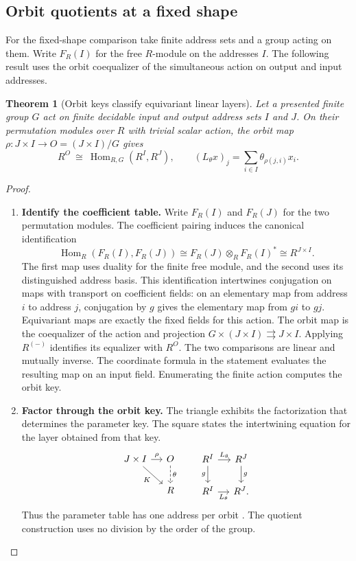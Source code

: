 \documentclass[11pt,a4paper]{article}
\newtheorem{theorem}{Theorem}[section]
\theoremstyle{definition}
\theoremstyle{remark}\newaliascnt{remark}{theorem}
\newcommand{\Hom}{\operatorname{Hom}}
\numberwithin{equation}{section}
\begin{document}
\subsection{Orbit quotients at a fixed shape}\label{sec:fixed-shape-orbits}
For the fixed-shape comparison take finite address sets and a group acting on them. Write \(F_R(I)\) for the free \(R\)-module on the addresses \(I\). The following result uses the orbit coequalizer of the simultaneous action on output and input addresses.
\begin{theorem}[Orbit keys classify equivariant linear layers]\label{thm:orbit}
Let a presented finite group $G$ act on finite decidable input and output address sets $I$ and $J$. On their permutation modules over $R$ with trivial scalar action, the orbit map $\rho:J\times I\to O=(J\times I)/G$ gives
\[
 R^O \ \cong\ \Hom_{R,G}(R^I,R^J),\qquad
 (L_\theta x)_j=\sum_{i\in I}\theta_{\rho(j,i)}x_i .
\]
\end{theorem}
\begin{proof}\leavevmode
\begin{enumerate}[titledsteps]
    \item \textbf{Identify the coefficient table.} Write \(F_R(I)\) and \(F_R(J)\) for the two permutation modules. The coefficient pairing induces the canonical identification
\[
 \Hom_R(F_R(I),F_R(J))\cong F_R(J)\otimes_R F_R(I)^*\cong R^{J\times I}.
\]
The first map uses duality for the finite free module, and the second uses its distinguished address basis. This identification intertwines conjugation on maps with transport on coefficient fields: on an elementary map from address \(i\) to address \(j\), conjugation by \(g\) gives the elementary map from \(gi\) to \(gj\). Equivariant maps are exactly the fixed fields for this action. The orbit map is the coequalizer of the action and projection \(G\times(J\times I)\rightrightarrows J\times I\). Applying \(R^{(-)}\) identifies its equalizer with \(R^O\). The two comparisons are linear and mutually inverse. The coordinate formula in the statement evaluates the resulting map on an input field. Enumerating the finite action computes the orbit key.


    \item \textbf{Factor through the orbit key.} The triangle exhibits the factorization that determines the parameter key. The square states the intertwining equation for the layer obtained from that key.
\[
\begin{tikzcd}[column sep=small]
 J\times I\arrow[r,"\rho"]\arrow[dr,"K"']&O\arrow[d,dashed,"\theta"]\\
 &R
\end{tikzcd}
\qquad
\begin{tikzcd}[column sep=small]
 R^I\arrow[r,"L_\theta"]\arrow[d,"g"']&R^J\arrow[d,"g"]\\
 R^I\arrow[r,"L_\theta"']&R^J .
\end{tikzcd}
\]
Thus the parameter table has one address per orbit \cite{orbit:sharing}. The quotient construction uses no division by the order of the group.\qedhere
\end{enumerate}
\end{proof}
\end{document}
